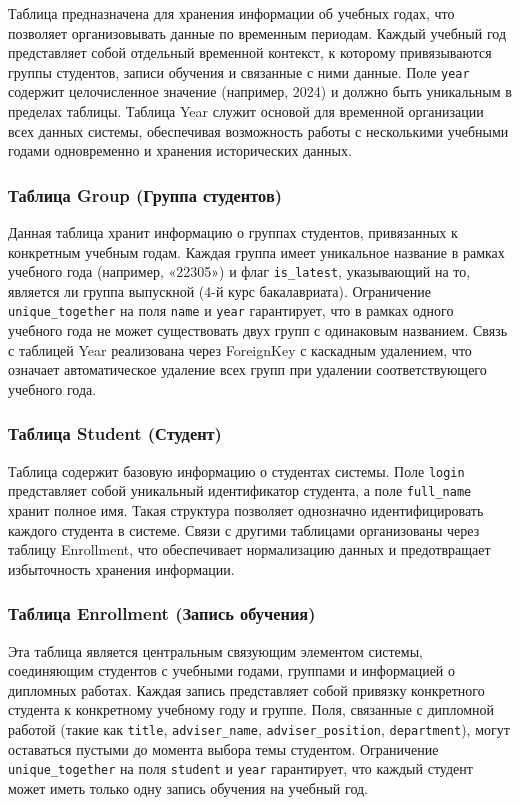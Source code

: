 \documentclass[a4paper,12pt]{article}
\begin{document}
Таблица предназначена для хранения информации об учебных годах, что позволяет организовывать данные по временным периодам. Каждый учебный год представляет собой отдельный временной контекст, к которому привязываются группы студентов, записи обучения и связанные с ними данные. Поле \texttt{year} содержит целочисленное значение (например, 2024) и должно быть уникальным в пределах таблицы. Таблица Year служит основой для временной организации всех данных системы, обеспечивая возможность работы с несколькими учебными годами одновременно и хранения исторических данных.

\subsubsection{Таблица Group (Группа студентов)}

Данная таблица хранит информацию о группах студентов, привязанных к конкретным учебным годам. Каждая группа имеет уникальное название в рамках учебного года (например, «22305») и флаг \texttt{is\_latest}, указывающий на то, является ли группа выпускной (4-й курс бакалавриата). Ограничение \texttt{unique\_together} на поля \texttt{name} и \texttt{year} гарантирует, что в рамках одного учебного года не может существовать двух групп с одинаковым названием. Связь с таблицей Year реализована через ForeignKey с каскадным удалением, что означает автоматическое удаление всех групп при удалении соответствующего учебного года.

\subsubsection{Таблица Student (Студент)}

Таблица содержит базовую информацию о студентах системы. Поле \texttt{login} представляет собой уникальный идентификатор студента, а поле \texttt{full\_name} хранит полное имя. Такая структура позволяет однозначно идентифицировать каждого студента в системе. Связи с другими таблицами организованы через таблицу Enrollment, что обеспечивает нормализацию данных и предотвращает избыточность хранения информации.

\subsubsection{Таблица Enrollment (Запись обучения)}

Эта таблица является центральным связующим элементом системы, соединяющим студентов с учебными годами, группами и информацией о дипломных работах. Каждая запись представляет собой привязку конкретного студента к конкретному учебному году и группе. Поля, связанные с дипломной работой (такие как \texttt{title}, \texttt{adviser\_name}, \texttt{adviser\_position}, \texttt{department}), могут оставаться пустыми до момента выбора темы студентом. Ограничение \texttt{unique\_together} на поля \texttt{student} и \texttt{year} гарантирует, что каждый студент может иметь только одну запись обучения на учебный год.
\end{document}
